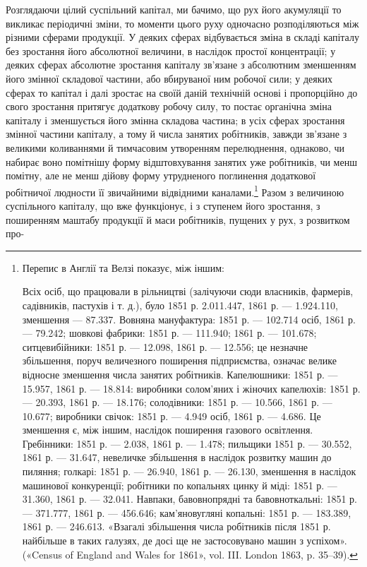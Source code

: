 Розглядаючи цілий суспільний капітал, ми бачимо, що рух
його акумуляції то викликає періодичні зміни, то моменти цього
руху одночасно розподіляються між різними сферами продукції.
У деяких сферах відбувається зміна в складі капіталу без зростання
його абсолютної величини, в наслідок простої концентрації;
у деяких сферах абсолютне зростання капіталу зв’язане з абсолютним
зменшенням його змінної складової частини, або вбируваної
ним робочої сили; у деяких сферах то капітал і далі зростає
на своїй даній технічній основі і пропорційно до свого зростання
притягує додаткову робочу силу, то постає органічна зміна капіталу
і зменшується його змінна складова частина; в усіх сферах
зростання змінної частини капіталу, а тому й числа занятих
робітників, завжди зв’язане з великими коливаннями й тимчасовим
утворенням перелюднення, однаково, чи набирає воно
помітнішу форму відштовхування занятих уже робітників, чи
менш помітну, але не менш дійову форму утрудненого поглинення
додаткової робітничої людности її звичайними відвідними каналами.\footnote{
Перепис в Англії та Велзі показує, між іншим:

Всіх осіб, що працювали в рільництві (залічуючи сюди власників,
фармерів, садівників, пастухів і т. д.), було 1851 р. 2.011.447, 1861 р. —
1.924.110, зменшення — 87.337. Вовняна мануфактура: 1851 р. — 102.714
осіб, 1861 р. — 79.242; шовкові фабрики: 1851 р. — 111.940; 1861 р. —
101.678; ситцевибійники: 1851 р. — 12.098, 1861 р. — 12.556; це незначне
збільшення, поруч величезного поширення підприємства, означає
велике відносне зменшення числа занятих робітників. Капелюшники:
1851 р. — 15.957, 1861 р. — 18.814: виробники солом’яних і жіночих капелюхів:
1851 р. — 20.393, 1861 р. — 18.176; солодівники: 1851 р. —
10.566, 1861 р. — 10.677; виробники свічок: 1851 р. — 4.949 осіб, 1861 р. —
4.686. Це зменшення є, між іншим, наслідок поширення газового освітлення.
Гребінники: 1851 р. — 2.038, 1861 р. — 1.478; пильщики 1851 р. —
30.552, 1861 р. — 31.647, невеличке збільшення в наслідок розвитку
машин до пиляння; голкарі: 1851 р. — 26.940, 1861 р. — 26.130, зменшення
в наслідок машинової конкуренції; робітники по копальнях цинку й
міді: 1851 р. — 31.360, 1861 р. — 32.041. Навпаки, бавовнопрядні та бавовноткальні:
1851 р. — 371.777, 1861 р. — 456.646; кам’яновугляні копальні:
1851 р. — 183.389, 1861 р. — 246.613. «Взагалі збільшення числа робітників
після 1851 р. найбільше в таких галузях, де досі ще не застосовувано
машин з успіхом». («Census of England and Wales for 1861», vol. III.
London 1863, p. 35--39).
}
Разом з величиною суспільного капіталу, що вже функціонує,
і з ступенем його зростання, з поширенням маштабу
продукції й маси робітників, пущених у рух, з розвитком про-
\parbreak{}  %
